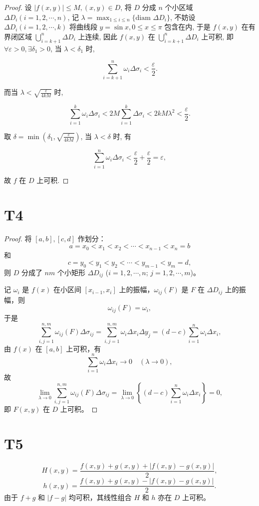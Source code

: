 \documentclass{article}
\begin{document}
\begin{proof}
    设 $|f(x,y)| \leq M, (x,y) \in D$, 将 $D$ 分成 $n$ 个小区域 $\Delta D_i (i=1,2,\cdots,n)$, 记 $\lambda = \max_{1 \leq i \leq n} \{ \text{diam } \Delta D_i \}$, 不妨设 $\Delta D_i (i=1,2,\cdots,k)$ 将曲线段 $y=\sin x, 0 \leq x \leq \pi$ 包含在内, 于是 $f(x,y)$ 在有界闭区域 $\bigcup_{i=k+1}^n \Delta D_i$ 上连续, 因此 $f(x,y)$ 在 $\bigcup_{i=k+1}^n \Delta D_i$ 上可积, 即 $\forall \varepsilon > 0, \exists \delta_1 > 0$, 当 $\lambda < \delta_1$ 时,

\[
\sum_{i=k+1}^n \omega_i \Delta \sigma_i < \frac{\varepsilon}{2}.
\]

而当 $\lambda < \sqrt{\frac{\varepsilon}{4kM}}$ 时,

\[
\sum_{i=1}^k \omega_i \Delta \sigma_i < 2M \sum_{i=1}^k \Delta \sigma_i < 2kM \lambda^2 < \frac{\varepsilon}{2}.
\]

取 $\delta = \min\left(\delta_1, \sqrt{\frac{\varepsilon}{4kM}}\right)$, 当 $\lambda < \delta$ 时, 有

\[
\sum_{i=1}^n \omega_i \Delta \sigma_i < \frac{\varepsilon}{2} + \frac{\varepsilon}{2} = \varepsilon,
\]

故 $f$ 在 $D$ 上可积.
\end{proof}

\section*{T4}

\begin{proof}
    将 $[a,b],[c,d]$ 作划分：
\[ 
a = x_0 < x_1 < x_2 < \cdots < x_{n-1} < x_n = b 
\]
和
\[ 
c = y_0 < y_1 < y_2 < \cdots < y_{m-1} < y_m = d, 
\]
则 $D$ 分成了 $nm$ 个小矩形 $\Delta D_{ij}$ ($i=1,2,\cdots,n$; $j=1,2,\cdots,m$)。

记 $\omega_i$ 是 $f(x)$ 在小区间 $[x_{i-1},x_i]$ 上的振幅，$\omega_{ij}(F)$ 是 $F$ 在 $\Delta D_{ij}$ 上的振幅，则
\[ 
\omega_{ij}(F) = \omega_i, 
\]
于是
\[ 
\sum_{i,j=1}^{n,m} \omega_{ij}(F) \Delta \sigma_{ij} = \sum_{i,j=1}^{n,m} \omega_i \Delta x_i \Delta y_j = (d-c) \sum_{i=1}^n \omega_i \Delta x_i, 
\]
由 $f(x)$ 在 $[a,b]$ 上可积，有
\[ 
\sum_{i=1}^n \omega_i \Delta x_i \to 0 \quad (\lambda \to 0), 
\]
故
\[ 
\lim_{\lambda \to 0} \sum_{i,j=1}^{n,m} \omega_{ij}(F) \Delta \sigma_{ij} = \lim_{\lambda \to 0} \left\{ (d-c) \sum_{i=1}^n \omega_i \Delta x_i \right\} = 0, 
\]
即 $F(x,y)$ 在 $D$ 上可积。
\end{proof}

\section*{T5}

\[
   H(x,y) = \frac{f(x,y) + g(x,y) + |f(x,y) - g(x,y)|}{2},
   \]
   \[
   h(x,y) = \frac{f(x,y) + g(x,y) - |f(x,y) - g(x,y)|}{2}.
   \]
   由于 \( f + g \) 和 \( |f - g| \) 均可积，其线性组合 \( H \) 和 \( h \) 亦在 \( D \) 上可积。
\end{document}
